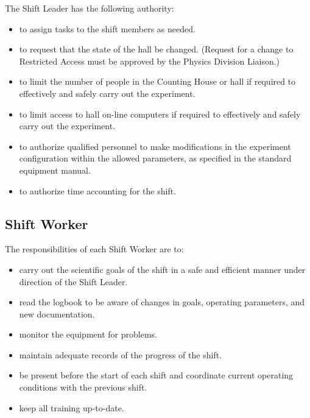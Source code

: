 \documentclass[11pt]{article}
\begin{document}
The Shift Leader has the following authority: 

\begin{itemize}

\item to assign tasks to the shift members as needed.

\item to request that the state of the hall be changed. (Request for a
change to Restricted Access must be approved by the Physics Division
Liaison.)

\item to limit the number of people in the Counting House or hall 
if required to effectively and safely carry out the experiment.

\item to limit access to hall on-line computers if required to
effectively and safely carry out the experiment.

\item to authorize qualified personnel to make modifications in the experiment
configuration within the allowed parameters, as specified in the standard equipment
manual.

\item to authorize time accounting for the shift.

\end{itemize}

\subsection{Shift Worker}
\indent

The responsibilities of each Shift Worker are to:
\begin{itemize}

\item carry out the scientific goals of the shift in a safe and efficient
 manner under direction of the Shift Leader.

\item read the logbook to be aware of changes in goals, operating
parameters, and new documentation.

\item monitor the equipment for problems.

\item maintain adequate records of the progress of the shift.

\item be present before the start of each shift and 
coordinate current operating conditions with the previous shift.

\item keep all training up-to-date.

\end{itemize}
\end{document}
